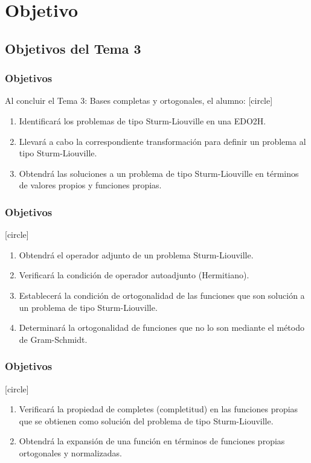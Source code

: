 \documentclass[12pt]{beamer}
\begin{document}
\section{Objetivo}
\subsection{Objetivos del Tema 3}

\begin{frame}
\frametitle{Objetivos}
Al concluir el Tema 3: Bases completas y ortogonales, el alumno:
[circle]
\begin{enumerate}[<+->]
\item Identificará los problemas de tipo Sturm-Liouville en una EDO2H.
\item Llevará a cabo la correspondiente transformación para definir un problema al tipo Sturm-Liouville.
\item Obtendrá las soluciones a un problema de tipo Sturm-Liouville en términos de valores propios y funciones propias.
\conti
\end{enumerate}
\end{frame}
\begin{frame}
\frametitle{Objetivos}
[circle]
\begin{enumerate}[<+->]
\conti
\item Obtendrá el operador adjunto de un problema Sturm-Liouville.
\item Verificará la condición de operador autoadjunto (Hermitiano).
\item Establecerá la condición de ortogonalidad de las funciones que son solución a un problema de tipo Sturm-Liouville.
\item Determinará la ortogonalidad de funciones que no lo son mediante el método de Gram-Schmidt.
\conti
\end{enumerate}
\end{frame}
\begin{frame}
\frametitle{Objetivos}
[circle]
\begin{enumerate}[<+->]
\conti
\item Verificará la propiedad de completes (completitud) en las funciones propias que se obtienen como solución del problema de tipo Sturm-Liouville.
\item Obtendrá la expansión de una función en términos de funciones propias ortogonales y normalizadas.
\end{enumerate}
\end{frame}
\end{document}
